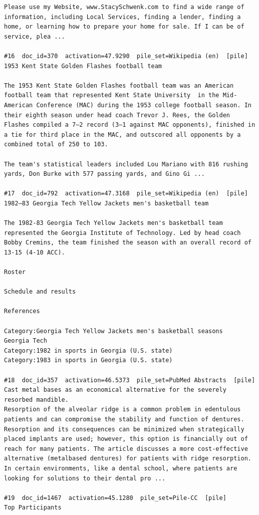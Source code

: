 \begin{verbatim}
Please use my Website, www.StacySchwenk.com to find a wide range of information, including Local Services, finding a lender, finding a home, or learning how to prepare your home for sale. If I can be of service, plea ...

#16  doc_id=370  activation=47.9290  pile_set=Wikipedia (en)  [pile]
1953 Kent State Golden Flashes football team

The 1953 Kent State Golden Flashes football team was an American football team that represented Kent State University  in the Mid-American Conference (MAC) during the 1953 college football season. In their eighth season under head coach Trevor J. Rees, the Golden Flashes compiled a 7–2 record (3–1 against MAC opponents), finished in a tie for third place in the MAC, and outscored all opponents by a combined total of 250 to 103.

The team's statistical leaders included Lou Mariano with 816 rushing yards, Don Burke with 577 passing yards, and Gino Gi ...

#17  doc_id=792  activation=47.3168  pile_set=Wikipedia (en)  [pile]
1982–83 Georgia Tech Yellow Jackets men's basketball team

The 1982-83 Georgia Tech Yellow Jackets men's basketball team represented the Georgia Institute of Technology. Led by head coach Bobby Cremins, the team finished the season with an overall record of 13-15 (4-10 ACC).

Roster

Schedule and results

References 

Category:Georgia Tech Yellow Jackets men's basketball seasons
Georgia Tech
Category:1982 in sports in Georgia (U.S. state)
Category:1983 in sports in Georgia (U.S. state)

#18  doc_id=357  activation=46.5373  pile_set=PubMed Abstracts  [pile]
Cast metal bases as an economical alternative for the severely resorbed mandible.
Resorption of the alveolar ridge is a common problem in edentulous patients and can compromise the stability and function of dentures. Resorption and its consequences can be minimized when strategically placed implants are used; however, this option is financially out of reach for many patients. The article discusses a more cost-effective alternative (metalbased dentures) for patients with ridge resorption. In certain environments, like a dental school, where patients are looking for solutions to their dental pro ...

#19  doc_id=1467  activation=45.1280  pile_set=Pile-CC  [pile]
Top Participants


\end{verbatim}
